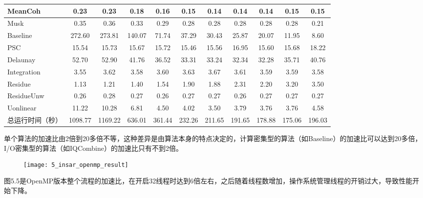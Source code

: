 \begin{table}[!htbp]
\begin{tabular}{|l|c|c|c|c|c|c|c|c|c|c|}
		MeanCoh	            &   0.23	&   0.23	&   0.18	&   0.16	&   0.15	&   0.14	&   0.14	&   0.14	&   0.15	&   0.15      \\ \hline
		Musk	            &   0.35	&   0.36	&   0.33	&   0.29	&   0.28	&   0.28	&   0.28	&   0.28	&   0.28	&   0.21      \\ \hline
		Baseline	        &   272.60	&   273.81	&   140.07	&   71.74	&   37.29	&   30.43	&   25.87	&   20.07	&   11.95	&   8.60      \\ \hline
		PSC	                &   15.54	&   15.73	&   15.67	&   15.72	&   15.46	&   15.56	&   16.95	&   15.60	&   15.68	&   18.22      \\ \hline
		Delaunay	        &   52.70	&   52.90	&   41.76	&   36.52	&   33.31	&   33.24	&   32.34	&   32.28	&   35.71	&   40.76      \\ \hline
		Integration	        &   3.55	&   3.62	&   3.58	&   3.60	&   3.63	&   3.67	&   3.61	&   3.59	&   3.59	&   3.58      \\ \hline
		Residue	            &   1.13	&   1.21	&   1.40	&   1.54	&   1.90	&   1.88	&   2.31	&   2.20	&   3.20	&   3.50      \\ \hline
		ResidueUnw	        &   0.26	&   0.28	&   0.27	&   0.26	&   0.27	&   0.27	&   0.26	&   0.27	&   0.27	&   0.27      \\ \hline
		Uonlinear	        &   11.22	&   10.28	&   6.81	&   4.50	&   4.02	&   3.50	&   3.79	&   3.76	&   3.76	&   4.58      \\ \hline
        总运行时间（秒） 	&   1098.77	&   1169.22	&   636.01	&   361.44	&   232.26	&   211.65	&   191.65	&   178.88	&   175.06	&   196.03      \\ \hline
    \end{tabular}
\end{table}

单个算法的加速比由2倍到20多倍不等，这种差异是由算法本身的特点决定的，计算密集型的算法（如Baseline）的加速比可以达到20多倍，I/O密集型的算法（如IQCombine）的加速比只有不到2倍。

\begin{figure}[!htbp]
    \centering
    \texttt{[image: 5\_insar\_openmp\_result]}
    \label{fig:5_insar_openmp_result}
\end{figure}

图5.5是OpenMP版本整个流程的加速比，在开启32线程时达到6倍左右，之后随着线程数增加，操作系统管理线程的开销过大，导致性能开始下降。

